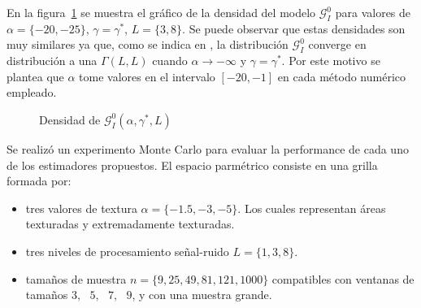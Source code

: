 En la figura~\ref{densidades} se muestra el gráfico de la densidad del modelo $\mathcal{G}_I^0$ para valores de $\alpha=\{-20,-25\}$, $\gamma=\gamma^*$, $L=\{3,8\}$. 
Se puede observar que estas densidades son muy similares ya que, como se indica en \citet{Frery99}, la distribución $\mathcal{G}_I^0$ converge en distribución a una $\Gamma(L,L)$ cuando $\alpha \rightarrow -\infty$ y $\gamma=\gamma^*$. 
Por este motivo se plantea que $\alpha$ tome valores en el intervalo $[-20,-1]$ en cada método numérico empleado. 

\begin{figure}[H]
	\centering
	\caption{\label{densidades}\small Densidad de $\mathcal{G}_I^0(\alpha,\gamma^*,L)$}
\end{figure}


Se realizó un experimento Monte Carlo para evaluar la performance de cada uno de los estimadores propuestos. El espacio parmétrico consiste en una grilla formada por:
\begin{itemize}
	\item tres valores de textura $\alpha=\{-1.5,-3,-5\}$. Los cuales representan áreas texturadas y extremadamente texturadas.
	\item tres niveles de procesamiento señal-ruido $L=\{1,3,8\}$.
	\item tamaños de muestra $n=\{9,25,49,81,121,1000\}$ compatibles con ventanas de tamaños $3,\text{ }5,\text{ }7,\text{ }9$, y con una muestra grande.
\end{itemize}

